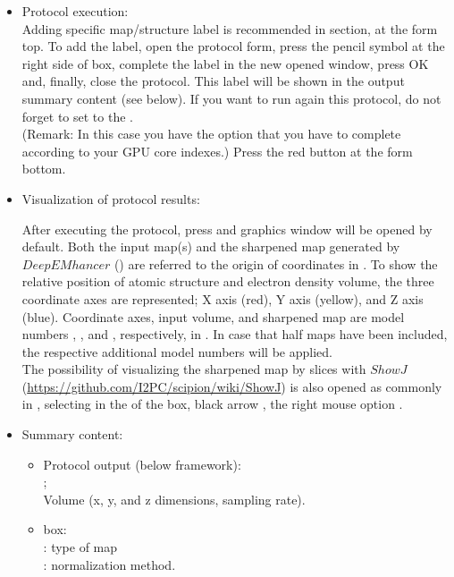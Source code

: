 \begin{itemize}
    \item Protocol execution:\\
  Adding specific map/structure label is recommended in  section, at the form top. To add the label, open the protocol form, press the pencil symbol at the right side of  box, complete the label in the new opened window, press OK and, finally, close the protocol. This label will be shown in the output summary content (see below). If you want to run again this protocol, do not forget to set to  the .\\
  (Remark: In this case you have the option  that you have to complete according to your GPU core indexes.)
  Press the  red button at the form bottom.
  
  \item Visualization of protocol results:
  
  After executing the protocol, press  and \chimera graphics window will be opened by default. Both the input map(s) and the sharpened map generated by $DeepEMhancer$ () are referred to the origin of coordinates in \chimera. To show the relative position of atomic structure and electron density volume, the three coordinate axes are represented; X axis (red), Y axis (yellow), and Z axis (blue). Coordinate axes, input volume, and sharpened map are model numbers ,  , and , respectively, in \chimera {}. In case that half maps have been included, the respective additional model numbers will be applied.\\
  
  The possibility of visualizing the sharpened map by slices with $ShowJ$ (\url{https://github.com/I2PC/scipion/wiki/ShowJ}) is also opened as commonly in \scipion, selecting in the  of the  box, black arrow , the right mouse option . 
  
  \item Summary content:
  \begin{itemize}
     \item Protocol output (below \scipion framework):\\ ;\\ Volume (x, y, and z dimensions, sampling rate).
     \item {} box:\\ : type of map\\ : normalization method.
  \end{itemize}
    
\end{itemize}

